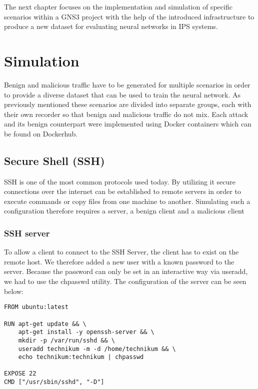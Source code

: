 \documentclass[conference]{IEEEtran}
\begin{document}
The next chapter focuses on the implementation and simulation of specific scenarios within a GNS3 project with the help of the introduced infrastructure to produce a new dataset for evaluating neural networks in IPS systems.  

\section{Simulation}
Benign and malicious traffic have to be generated for multiple scenarios in order to provide a diverse dataset that can be used to train the neural network. As previously mentioned these scenarios are divided into separate groups, each with their own recorder so that benign and malicious traffic do not mix. Each attack and its benign counterpart were implemented using Docker containers which can be found on Dockerhub.

\subsection{Secure Shell (SSH)}
SSH is one of the most common protocols used today. By utilizing it secure connections over the internet can be established to remote servers in order to execute commands or copy files from one machine to another. Simulating such a configuration therefore requires a server, a benign client and a malicious client

\subsubsection{SSH server}
To allow a client to connect to the SSH Server, the client has to exist on the remote host. We therefore added a new user with a known password to the server. Because the password can only be set in an interactive way via useradd, we had to use the chpasswd utility. 
The configuration of the server can be seen below: 

\begin{lstlisting}[basicstyle=\footnotesize]
FROM ubuntu:latest

RUN apt-get update && \ 
    apt-get install -y openssh-server && \
    mkdir -p /var/run/sshd && \
    useradd technikum -m -d /home/technikum && \
    echo technikum:technikum | chpasswd

EXPOSE 22
CMD ["/usr/sbin/sshd", "-D"]
\end{lstlisting}
\end{document}
